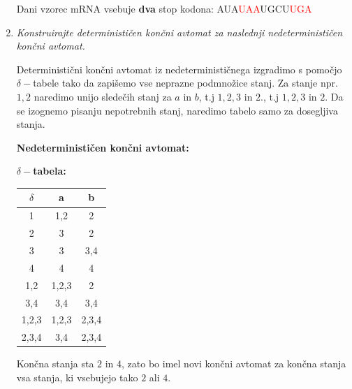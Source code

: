 \documentclass{article}
\begin{document}
\begin{enumerate}
		Dani vzorec mRNA vsebuje \textbf{dva} stop kodona: AUA\textcolor{red}{UAA}UGCU\textcolor{red}{UGA}

		\newpage

	\item \textit{Konstruirajte determinističen končni avtomat za naslednji
		nedeterminističen končni avtomat.}

		Deterministični končni avtomat iz nedeterminističnega izgradimo s pomočjo
		$\delta-$tabele tako da zapišemo vse neprazne podmnožice stanj. Za stanje
		npr. $1,2$ naredimo unijo sledečih stanj za $a$ in $b$, t.j $1,2,3$ in $2$., t.j $1,2,3$ in
		$2$. Da se izognemo pisanju nepotrebnih stanj, naredimo tabelo samo za dosegljiva
		stanja.

		\textbf{Nedeterminističen končni avtomat:}

		\begin{center}

			\textbf{$\delta-$tabela:}

			\begin{tabular}{|c||c|c|}
				\hline
				$\delta$ & a & b \\
				\hline\hline
				1 & 1,2 & 2 \\
				\hline
				2 & 3 & 2 \\
				\hline
				3 & 3 & 3,4 \\
				\hline
				4 & 4 & 4 \\
				\hline
				1,2 & 1,2,3 & 2 \\
				\hline
				3,4 & 3,4 & 3,4 \\
				\hline
				1,2,3 & 1,2,3 & 2,3,4 \\
				\hline
				2,3,4 & 3,4 & 2,3,4 \\
				\hline
			\end{tabular}
		\end{center}

		Končna stanja sta $2$ in $4$, zato bo imel novi končni avtomat za končna
		stanja vsa stanja, ki vsebujejo tako $2$ ali $4$.


\end{enumerate}
\end{document}
